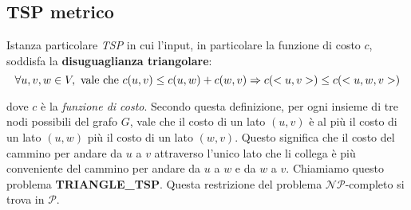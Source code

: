 \label{tsp_metrico}
\subsection{TSP metrico}

Istanza particolare \textit{TSP} in cui l'input, in particolare la funzione di costo $c$, soddisfa la
\textbf{disuguaglianza triangolare}:
\[
\forall u, v, w \in V, \textnormal{ vale che } c(u, v) \le c(u, w) + c(w, v) \Rightarrow
c(<u, v>) \le c(<u, w, v>)
\]

dove $c$ è la \textit{funzione di costo}. Secondo questa definizione, per ogni insieme di tre nodi
possibili del grafo $G$, vale che il costo di un lato $(u, v)$ è al più il costo di un lato $(u, w)$
più il costo di un lato $(w, v)$. Questo significa che il costo del cammino per andare da $u$ a $v$
attraverso l'unico lato che li collega è più conveniente del cammino per andare da $u$ a $w$ e da
$w$ a $v$. Chiamiamo questo problema \textbf{TRIANGLE\_TSP}. Questa restrizione del problema
$\mathcal{NP}$-completo si trova in $\mathcal{P}$.


